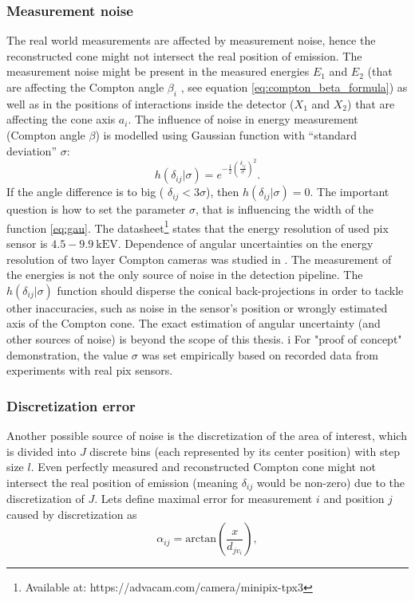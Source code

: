 \subsubsection{Measurement noise}
The real world measurements are affected by measurement noise, hence the reconstructed cone might not intersect the real position of emission.
The measurement noise might be present in the measured energies $E_{1}$ and $E_{2}$ (that are affecting the Compton angle $\beta_{i}$ , see equation \ref{eq:compton_beta_formula}) 
as well as in the positions of interactions inside the detector ($X_{1}$ and $X_{2}$) 
that are affecting the cone axis $a_{i}$.
The influence of noise in energy measurement (Compton angle $\beta$) is modelled using Gaussian function with ``standard deviation'' $\sigma$:
\begin{equation}
  h(\delta_{ij}|\sigma) = e^{-\frac{1}{2}(\frac{\delta_{ij}}{\sigma})^{2}}.
  \label{eq:gau}
\end{equation}
If the angle difference is to big ( $\delta_{ij}<3\sigma$), then $h(\delta_{ij}|\sigma) = 0$.
The important question is how to set the parameter $\sigma$, that is influencing the width of the function \ref{eq:gau}.
The datasheet\footnote{Available at: https://advacam.com/camera/minipix-tpx3}
states that the energy resolution of used \ac{pix} sensor is $4.5 - 9.9\ \mathrm{kEV}$. 
Dependence of angular uncertainties on the energy resolution of two layer Compton cameras was studied in \cite{ordonez}.
The measurement of the energies is not the only source of noise in the detection pipeline.
The $h(\delta_{ij}|\sigma)$ function should disperse the conical back-projections in order to tackle other inaccuracies, such as noise in the sensor's position or wrongly estimated axis of the Compton cone. 
The exact estimation of angular uncertainty (and other sources of noise) is beyond the scope of this thesis.
i%
For "proof of concept" demonstration, the value $\sigma$ was set empirically based on recorded data from experiments with real \ac{pix} sensors.

\subsubsection{Discretization error}
Another possible source of noise is the discretization of the area of interest, which is divided into $J$ discrete bins (each represented by its center position) with step size $l$.
Even perfectly measured and reconstructed Compton cone might not intersect the real position of emission (meaning $\delta_{ij}$ would be non-zero) due to the discretization of $J$.
Lets define maximal error for measurement $i$ and position $j$ caused by discretization as
\begin{equation}
  \alpha_{ij} = \mathrm{arctan}(\frac{x}{d_{jv_{i}}}),
  \label{eq:alpha}
\end{equation}

